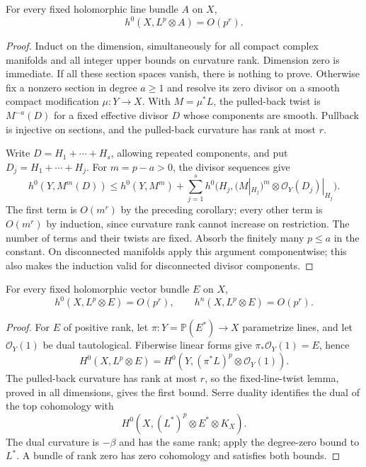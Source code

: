 \begin{lemma}\label{lem:curvature-rank-fixed-line-twist}
For every fixed holomorphic line bundle $A$ on $X$,
\[
 h^0(X,L^p\otimes A)=O(p^r).
\]
\end{lemma}
\begin{proof}
Induct on the dimension, simultaneously for all compact complex manifolds and all integer upper bounds on curvature rank. Dimension zero is immediate. If all these section spaces vanish, there is nothing to prove. Otherwise fix a nonzero section in degree $a\geq1$ and resolve its zero divisor on a smooth compact modification $\mu:Y\to X$. With $M=\mu^*L$, the pulled-back twist is $M^{-a}(D)$ for a fixed effective divisor $D$ whose components are smooth. Pullback is injective on sections, and the pulled-back curvature has rank at most $r$.

Write $D=H_1+\cdots+H_s$, allowing repeated components, and put $D_j=H_1+\cdots+H_j$. For $m=p-a>0$, the divisor sequences give
\[
 h^0(Y,M^m(D))
 \leq h^0(Y,M^m)+\sum_{j=1}^s
       h^0\bigl(H_j,(M|_{H_j})^m\otimes\mathcal O_Y(D_j)|_{H_j}\bigr).
\]
The first term is $O(m^r)$ by the preceding corollary; every other term is $O(m^r)$ by induction, since curvature rank cannot increase on restriction. The number of terms and their twists are fixed. Absorb the finitely many $p\leq a$ in the constant. On disconnected manifolds apply this argument componentwise; this also makes the induction valid for disconnected divisor components.
\end{proof}

\begin{corollary}\label{cor:curvature-rank-endpoint-cohomology}
For every fixed holomorphic vector bundle $E$ on $X$,
\[
 h^0(X,L^p\otimes E)=O(p^r),
 \qquad h^n(X,L^p\otimes E)=O(p^r).
\]
\end{corollary}
\begin{proof}
For $E$ of positive rank, let $\pi:Y=\mathbb P(E^*)\to X$ parametrize lines, and let $\mathcal O_Y(1)$ be dual tautological. Fiberwise linear forms give $\pi_*\mathcal O_Y(1)=E$, hence
\[
 H^0(X,L^p\otimes E)
 =H^0(Y,(\pi^*L)^p\otimes\mathcal O_Y(1)).
\]
The pulled-back curvature has rank at most $r$, so the fixed-line-twist lemma, proved in all dimensions, gives the first bound. Serre duality identifies the dual of the top cohomology with
\[
 H^0(X,(L^*)^p\otimes E^*\otimes K_X).
\]
The dual curvature is $-\beta$ and has the same rank; apply the degree-zero bound to $L^*$. A bundle of rank zero has zero cohomology and satisfies both bounds.
\end{proof}

